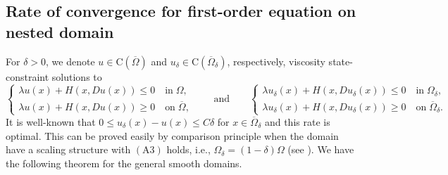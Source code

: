 \documentclass[11pt,reqno]{amsart}
\numberwithin{figure}{section}
\theoremstyle{plain}
\theoremstyle{remark}
\numberwithin{equation}{section}
\newcommand{\rmC}{\mathrm{C}}
\begin{document}
\subsection{Rate of convergence for first-order equation on nested domain}
For $\delta >0$, we denote $u\in \rmC(\overline{\Omega})$ and $u_\delta\in \rmC(\overline{\Omega}_\delta)$, respectively, viscosity state-constraint solutions to 
\begin{equation*}
    \begin{cases}
    \lambda u(x)+H(x,Du(x)) \leq 0 \quad\text{in}\;\Omega,\\
    \lambda u(x)+H(x,Du(x)) \geq 0 \quad\text{on}\;\overline{\Omega},
    \end{cases}\qquad\text{and}\qquad 
    \begin{cases}
    \lambda u_\delta(x)+H(x,Du_\delta(x)) \leq 0 \quad\text{in}\;\Omega_\delta,\\
    \lambda u_\delta(x)+H(x,Du_\delta(x)) \geq 0 \quad\text{on}\;\overline{\Omega}_\delta.
    \end{cases}
\end{equation*} 
It is well-known that $0\leq u_\delta(x) - u(x) \leq C\delta$ for $x\in\overline{\Omega}_\delta$ and this rate is optimal. This can be proved easily by comparison principle when the domain have a scaling structure with $\mathrm{(A3)}$ holds, i.e., $\Omega_\delta = (1-\delta)\Omega$ (see \cite{kim_state-constraint_2020}). We have the following theorem for the general smooth domains.
\end{document}
